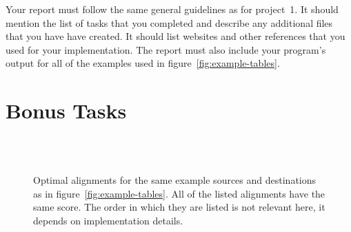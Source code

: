 \documentclass[a4paper,10pt]{article}
\begin{document}
Your report must follow the same general guidelines as for project~1.
It should mention the list of tasks that you completed and describe any additional files that you have have created.
It should list websites and other references that you used for your implementation.
The report must also include your program's output for all of the examples used in figure~\ref{fig:example-tables}.



\section{Bonus Tasks}

\begin{figure}
  \begin{minipage}{80mm}
    \fbox{\begin{minipage}{60mm}
        \footnotesize
        
    \end{minipage}}\\[\baselineskip]
    \fbox{\begin{minipage}{60mm}
        \footnotesize
        
    \end{minipage}}\\[\baselineskip]
    \fbox{\begin{minipage}{60mm}
        \footnotesize
        
    \end{minipage}}
  \end{minipage}
  \fbox{\begin{minipage}{45mm}
      \footnotesize
      
  \end{minipage}}
  \caption{
    Optimal alignments for the same example sources and destinations as in figure~\ref{fig:example-tables}.
    All of the listed alignments have the same score.
    The order in which they are listed is not relevant here, it depends on implementation details.
  }\label{fig:example-traces}
\end{figure}
\end{document}
